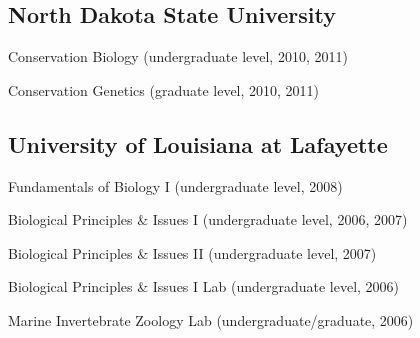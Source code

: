 \documentclass[letterpaper]{article}
\renewenvironment{itemize}{
  \begin{list}{}{
    \setlength{\leftmargin}{1em}
  }
}{
  \end{list}
}
\begin{document}
  \subsection*{North Dakota State University}
    \begin{itemize}
      \item Conservation Biology (undergraduate level, 2010, 2011)
      \item Conservation Genetics (graduate level, 2010, 2011)\\
    \end{itemize}
    
  \subsection*{University of Louisiana at Lafayette}
    \begin{itemize}
      \item Fundamentals of Biology I (undergraduate level, 2008)
      \item Biological Principles \& Issues I (undergraduate level, 2006, 2007)
      \item Biological Principles \& Issues II (undergraduate level, 2007)
      \item Biological Principles \& Issues I Lab (undergraduate level, 2006)
      \item Marine Invertebrate Zoology Lab (undergraduate/graduate, 2006)
    \end{itemize}
   
   
\end{document}
